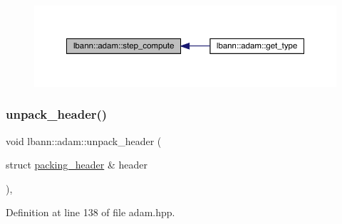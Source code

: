 \begin{figure}[H]
\begin{center}
\leavevmode
\includegraphics[width=350pt]{classlbann_1_1adam_a3bcd1bcbbed2b99c407eb0cd9fd6d449_icgraph}
\end{center}
\end{figure}
\mbox{\label{classlbann_1_1adam_ae5b6108946e6a09b4e13e4285350aa05}} 
\subsubsection{\texorpdfstring{unpack\+\_\+header()}{unpack\_header()}}
{\footnotesize\ttfamily void lbann\+::adam\+::unpack\+\_\+header (\begin{DoxyParamCaption}\item[{struct \hyperlink{structlbann_1_1adam_1_1packing__header}{packing\+\_\+header} \&}]{header }\end{DoxyParamCaption})\hspace{0.3cm}{\ttfamily [inline]}, {\ttfamily [private]}}



Definition at line 138 of file adam.\+hpp.



